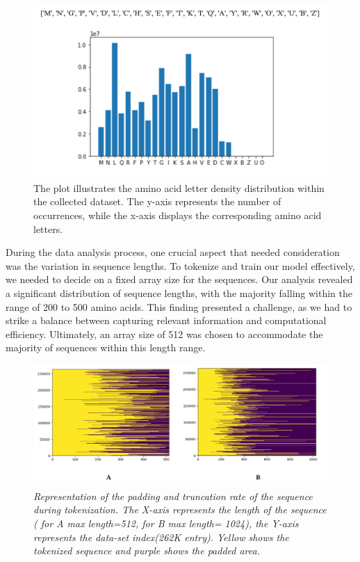 \documentclass[conference]{IEEEtran}
\begin{document}
\begin{figure}[htp]
    \centering
    \includegraphics[width=1\linewidth]{images/Dataset_analysis.png}
    \caption{The plot illustrates the amino acid letter density distribution within the collected dataset. The y-axis represents the number of occurrences, while the x-axis displays the corresponding amino acid letters.}
    \label{fig:dataset_analysis}
\end{figure}

During the data analysis process, one crucial aspect that needed consideration was the variation in sequence lengths. To tokenize and train our model effectively, we needed to decide on a fixed array size for the sequences. Our analysis revealed a significant distribution of sequence lengths, with the majority falling within the range of 200 to 500 amino acids. This finding presented a challenge, as we had to strike a balance between capturing relevant information and computational efficiency. Ultimately, an array size of 512 was chosen to accommodate the majority of sequences within this length range.

\begin{figure}[htp!]
    \centering
    \includegraphics[width=13cm]{images/truncation.png}
    \caption{\emph{Representation of the padding and truncation rate of the sequence during tokenization. The X-axis represents the length of the sequence ( for A max length=512, for B max length= 1024), the Y-axis represents the data-set index(262K entry). Yellow shows the tokenized sequence and purple shows the padded area.}}
    \label{fig:truncation}
\end{figure}
\end{document}
